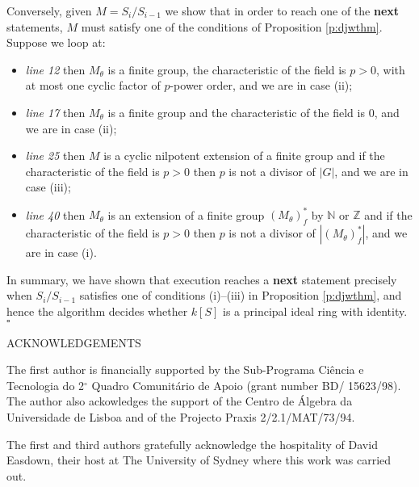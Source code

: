\documentclass[12pt]{article}
\newenvironment{proofthm}{{\it Proof\/}}{$\square$\\}
\begin{document}
\begin{proofthm}
Conversely, given  $M = S_i/S_{i-1}$ we show that in order to
reach one of the {\bf next} statements, $M$ must satisfy one of the conditions
of Proposition  \ref{p:djwthm}. Suppose we loop at:
\begin{itemize}
\item \emph{line 12} then $M_\theta$ is a finite group, the characteristic
of the field is $p > 0$,  with at most one cyclic factor of $p$-power order,
and we are in case (ii);
\item \emph{line 17} then $M_\theta$ is a finite group and the characteristic
of the field is $0$, and we are in case (ii);
\item \emph{line 25} then $M$ is a cyclic nilpotent extension of a 
finite group and if the characteristic of
the field is $p > 0$ then $p$ is not a divisor of $|G|$, and we are in case
(iii);
\item \emph{line 40} then $M_\theta$ is an extension of a finite group 
$(M_\theta)^*_f$ by $\mathbb{N}$ or $\mathbb{Z}$ and if the 
characteristic of the field is $p > 0$ then $p$ is not a divisor 
of $|(M_\theta)^*_f|$, and  we are in case (i).
\end{itemize}

In summary, we have shown that execution reaches a {\bf next} statement
precisely when $S_i/S_{i-1}$ satisfies one of conditions (i)--(iii) 
in Proposition \ref{p:djwthm}, and hence the algorithm decides
whether $k[S]$ is a principal ideal ring with identity.  
\end{proofthm}

\begin{center}
{ACKNOWLEDGEMENTS}
\end{center}

The first author is financially supported by the
Sub-Programa Ci\^encia e Tecnologia do 2$^{\circ}$ 
Quadro Comunit\'ario de Apoio (grant number BD/ 15623/98). 
The author also ackowledges the support of
the Centro de \'Algebra da Universidade de Lisboa and of the Projecto
Praxis 2/2.1/MAT/73/94.

The first and third authors gratefully acknowledge the 
hospitality of David Easdown, their host at The  University of Sydney
where this work was carried out.
\end{document}
